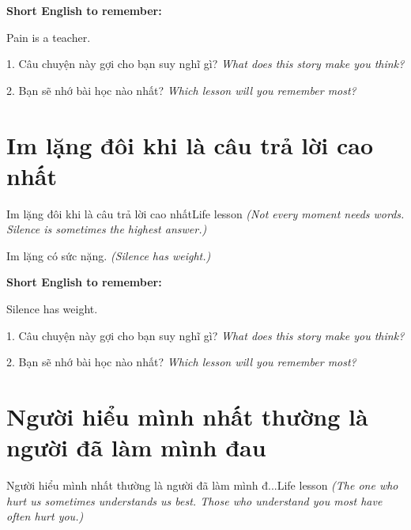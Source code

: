 \begin{ghinhoanh}
\textbf{Short English to remember:}

Pain is a teacher.

\end{ghinhoanh}

\begin{tuhocnhanh}
1. Câu chuyện này gợi cho bạn suy nghĩ gì? \textit{What does this story make you think?}

2. Bạn sẽ nhớ bài học nào nhất? \textit{Which lesson will you remember most?}
\end{tuhocnhanh}
\ngancach


\section{Im lặng đôi khi là câu trả lời cao nhất}
\begin{truyen}{Im lặng đôi khi là câu trả lời cao nhất}{Life lesson}
\textit{(Not every moment needs words. Silence is sometimes the highest answer.)}
\end{truyen}

\begin{baihoc}
Im lặng có sức nặng.
\textit{(Silence has weight.)}
\end{baihoc}

\begin{ghinhoanh}
\textbf{Short English to remember:}

Silence has weight.

\end{ghinhoanh}

\begin{tuhocnhanh}
1. Câu chuyện này gợi cho bạn suy nghĩ gì? \textit{What does this story make you think?}

2. Bạn sẽ nhớ bài học nào nhất? \textit{Which lesson will you remember most?}
\end{tuhocnhanh}
\ngancach


\section{Người hiểu mình nhất thường là người đã làm mình đau}
\begin{truyen}{Người hiểu mình nhất thường là người đã làm mình đ...}{Life lesson}
\textit{(The one who hurt us sometimes understands us best. Those who understand you most have often hurt you.)}
\end{truyen}

